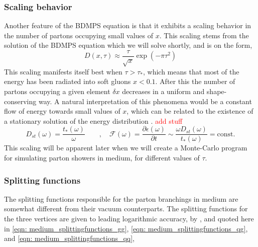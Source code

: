 \documentclass[main.tex]{subfiles}
\begin{document}
\subsubsection*{Scaling behavior}
Another feature of the BDMPS equation is that it exhibits a scaling behavior in the number of partons occupying small values of \(x\). This scaling stems from the solution of the BDMPS equation which we will solve shortly, and is on the form, 
\begin{equation}\label{eqn: BDMPS_scaling_behaviour}
    D(x,\tau) \approx \frac{\tau}{\sqrt{x}} \exp \left(-\pi \tau^2\right)
\end{equation}
This scaling manifests itself best when \(\tau > \tau_*\), which means that most of the energy has been radiated into soft gluons \(x<0.1\). After this the number of partons occupying a given element \(\delta x\) decreases in a uniform and shape-conserving way. A natural interpretation of this phenomena would be a constant flow of energy towards small values of \(x\), which can be related to the existence of a stationary solution of the energy distribution \cite{Energy_flow_medium_cascade_2016}. \elab \textcolor{red}{add stuff}
\begin{equation}
    D_{st} (\omega) = \frac{t_*(\omega)}{\omega} \qquad , \quad \mathcal{F}(\omega) = \frac{\partial \epsilon(\omega)}{\partial t} \sim \frac{\omega D_{st}(\omega)}{t_*(\omega)} =\text{const.}
\end{equation}
This scaling will be apparent later when we will create a Monte-Carlo program for simulating parton showers in medium, for different values of \(\tau\). 

\subsubsection*{Splitting functions}\label{sec: medium_splitting_functions}
The splitting functions responsible for the parton branchings in medium are somewhat different from their vacuum counterparts. The splitting functions for the three vertices are given to leading logarithmic accuracy, by \cite{Universal_quark_gluon_ratio_in_medium-induced_parton_cascade}, and quoted here in \autoref{eqn: medium_splittingfunctions_gg}, \autoref{eqn: medium_splittingfunctions_qg}, and \autoref{eqn: medium_splittingfunctions_qq},
\end{document}
